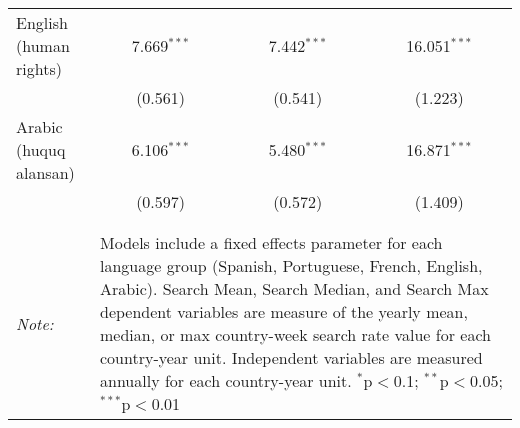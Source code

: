 \begin{table}[!htbp]
\begin{tabular}{@{\extracolsep{5pt}}lccc}
  English (human rights) & 7.669$^{***}$ & 7.442$^{***}$ & 16.051$^{***}$ \\ 
  & (0.561) & (0.541) & (1.223) \\ 
  Arabic (huquq alansan) & 6.106$^{***}$ & 5.480$^{***}$ & 16.871$^{***}$ \\ 
  & (0.597) & (0.572) & (1.409) \\ 
 \hline \\[-1.8ex] 
\hline 
\hline \\[-1.8ex] 
\textit{Note:}  & \multicolumn{3}{l}{\parbox[t]{8cm}{Models include a fixed effects parameter for each language group (Spanish, Portuguese, French, English, Arabic). Search Mean, Search Median, and Search Max dependent variables are measure of the yearly mean, median, or max country-week search rate value for each country-year unit. Independent variables are measured annually for each country-year unit. $^{*}$p$<$0.1; $^{**}$p$<$0.05; $^{***}$p$<$0.01}} \\ 
\end{tabular} 
\end{table} 
